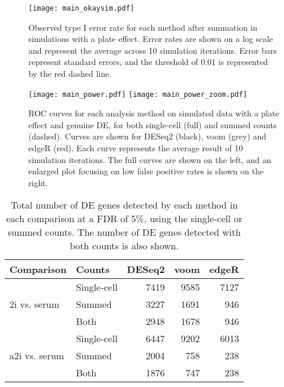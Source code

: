 \documentclass[oupdraft]{bio}
\begin{document}
\begin{figure}[!p]
\begin{center}
\texttt{[image: main\_okaysim.pdf]}
\end{center}
\caption{
    Observed type I error rate for each method after summation in simulations with  a plate effect.
    Error rates are shown on a log scale and represent the average across 10 simulation iterations.
    Error bars represent standard errors, and the threshold of 0.01 is represented by the red dashed line.
}
\label{fig:platesum}
\end{figure}

\begin{figure}[!p]
\begin{center}
\texttt{[image: main\_power.pdf]}
\texttt{[image: main\_power\_zoom.pdf]}
\end{center}
\caption{
    ROC curves for each analysis method on simulated data with a plate effect and genuine DE, for both single-cell (full) and summed counts (dashed).
    Curves are shown for DESeq2 (black), voom (grey) and  edgeR (red).
    Each curve represents the average result of 10 simulation iterations.
    The full curves are shown on the left, and an enlarged plot focusing on low false positive rates is shown on the right.
}
\label{fig:roc}
\end{figure}

\begin{table}[!p]
\caption{Total number of DE genes detected by each method in each comparison at a FDR of 5\%, using the single-cell or summed counts.
The number of DE genes detected with both counts is also shown.
}
\label{tab:realnum}
\begin{center}
\begin{tabular}{l l r r r}
\hline
\textbf{Comparison} & \textbf{Counts} & \textbf{DESeq2} & \textbf{voom} & \textbf{edgeR} \\
\hline
\multirow{3}{*}{2i vs. serum} 
& Single-cell & 7419 & 9585 & 7127 \\
& Summed & 3227 & 1691 & 946 \\
& Both & 2948 & 1678 & 946 \\
\hline
\multirow{3}{*}{a2i vs. serum} 
& Single-cell & 6447 & 9202 & 6013 \\
& Summed & 2004 & 758 & 238 \\
& Both & 1876 & 747 & 238 \\
\hline
\end{tabular}
\end{center}
\end{table}
\end{document}
